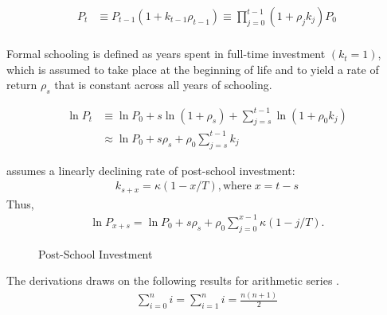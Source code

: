 \begin{frame}
\begin{align*}
P_t & \equiv P_{t - 1} (1 + k_{t - 1} \rho_{t - 1}) \equiv \prod^{t - 1}_{j= 0} (1 + \rho_jk_j)P_0 \\
\end{align*}
\end{frame}
\begin{frame}
Formal schooling is defined as years spent in full-time investment $(k_t = 1)$, which is assumed to take place at the beginning of life and to yield a rate of return $\rho_s$ that is constant across all years of schooling.

\begin{align*}
\ln{P_t} & \equiv \ln{P_0}  + s \ln{(1 + \rho_s)} + \sum^{t-1}_{j=s} \ln{(1 + \rho_0 k_j)} \\
& \approx  \ln{P_0} + s \rho_s + \rho_0 \sum^{t - 1}_{j=s} k_j
\end{align*}
\end{frame}
\begin{frame}
 assumes a linearly declining rate of post-school investment:
\begin{align*}
k_{s + x} = \kappa\left( 1 - x/T\right), \text{where}\; x = t - s
\end{align*}
Thus,
\begin{align*}
\ln{P_{x+s}} = \ln{P_0} + s \rho_s + \rho_0 \sum_{j=0}^{x - 1} \kappa \left(1 - j/T\right).
\end{align*}
\end{frame}
\begin{frame}
\begin{figure}[htp]\centering
\caption{Post-School Investment}
\end{figure}
\end{frame}
\begin{frame}
The derivations draws on the following results for arithmetic series \cite{Chapman.2018}.
\begin{align*}
\sum^n_{i = 0} i = \sum^n_{i = 1} i = \frac{n(n + 1)}{2}
\end{align*}
\end{frame}

